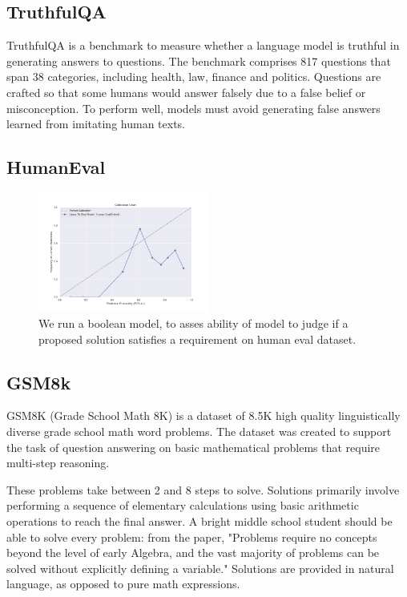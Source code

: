 \documentclass[11pt]{article}
\begin{document}
\subsection{TruthfulQA}

TruthfulQA is a benchmark to measure whether a language model is truthful in generating answers to questions. The benchmark comprises 817 questions that span 38 categories, including health, law, finance and politics. Questions are crafted so that some humans would answer falsely due to a false belief or misconception. To perform well, models must avoid generating false answers learned from imitating human texts.


\subsection{HumanEval}

\begin{figure}
  \includegraphics[width=0.5\textwidth]{figures/0-shot-7b-human-eval.png}
  \caption{We run a boolean model, to asses ability of model to judge if a proposed solution satisfies a requirement on human eval dataset.}
  \label{fig:human-eval-results}
\end{figure}

\subsection{GSM8k}

GSM8K (Grade School Math 8K) is a dataset of 8.5K high quality linguistically diverse grade school math word problems. The dataset was created to support the task of question answering on basic mathematical problems that require multi-step reasoning.

These problems take between 2 and 8 steps to solve. Solutions primarily involve performing a sequence of elementary calculations using basic arithmetic operations  to reach the final answer. A bright middle school student should be able to solve every problem: from the paper, "Problems require no concepts beyond the level of early Algebra, and the vast majority of problems can be solved without explicitly defining a variable." Solutions are provided in natural language, as opposed to pure math expressions. 
\end{document}
